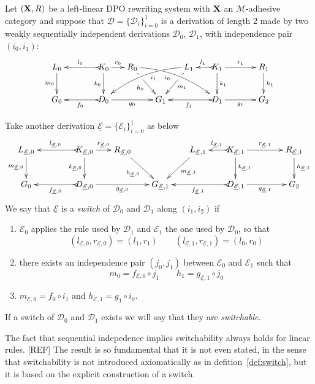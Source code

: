 \documentclass[a4paper,UKenglish,cleveref,pdftex, thm-restate,numberwithinsect]{lipics}
\def\R{\mathsf{R}}
\def\X{\textbf {\textup{X}}}
\newcommand{\dder}[1]{\mathscr{#1}}
\newcommand{\der}[1]{\underline{\dder{#1}}}
\begin{document}
\begin{definition}[Switch]
  \label{def:switch}
  Let $(\X, \R)$ be a left-linear DPO rewriting system with $\X$ an
  $\mathcal{M}$-adhesive category and suppose that
  $\der{D}=\{\dder{D}_i\}_{i=0}^1$ is a derivation of length $2$ made
  by two weakly sequentially independent derivations $\dder{D}_0$,
  $\dder{D}_1$, with independence pair $(i_0, i_1)$:
  \[\xymatrix@C=15pt{L_0 \ar[d]_{m_0}&& K_0 \ar[d]_{k_0}\ar@{>->}[ll]_{l_0} \ar[r]^{r_0} & R_0 \ar@/^.35cm/[drrr]|(.3)\hole_(.4){i_0} \ar[dr]|(.3)\hole_{h_0} && L_1 \ar@/_.35cm/[dlll]^(.4){i_1} \ar[dl]|(.3)\hole^{m_1}& K_1 \ar[d]^{k_1}\ar@{>->}[l]_{l_1} \ar[rr]^{r_1} && R_1 \ar[d]^{h_1}\\G_0 && \ar@{>->}[ll]^{f_0} D_0 \ar[rr]_{g_0}&& G_1  && \ar@{>->}[ll]^{f_1} D_1 \ar[rr]_{g_1}&& G_2}\]
 	
  Take another derivation $\der{E}=\{\dder{E}_i\}_{i=0}^1$ as below
\[\xymatrix@C=18pt{L_{\der{E},0} \ar[d]_{m_{\der{E},0}}&& K_{\der{E},0} \ar[d]_{k_{\der{E},0}}\ar@{>->}[ll]_{l_{\der{E},0}} \ar[r]^{r_{\der{E},0}} & R_{\der{E},0} \ar[dr]_{h_{\der{E},0}} && L_{\der{E},1} \ar[dl]^{m_{\der{E},1}}& K_{\der{E},1} \ar[d]^{k_{\der{E},1}}\ar@{>->}[l]_{l_{\der{E},1}} \ar[rr]^{r_{\der{E},1}} && R_{\der{E},1} \ar[d]^{h_{\der{E},1}}\\G_{0} && \ar@{>->}[ll]^{f_{\der{E},0}} D_{\der{E},0} \ar[rr]_{g_{\der{E},0}}&& G_{\der{E},1} && \ar@{>->}[ll]^{f_{\der{E},1}} D_{\der{E},1} \ar[rr]_{g_{\der{E},1}}&& G_{2}}\]
 	We say that $\der{E}$ is a
 	 	 \emph{switch} of $\dder{D}_0$ and $\dder{D}_1$ along $(i_1, i_2)$ if
 	\begin{enumerate}
 		\item $\dder{E}_0$ applies the rule used by $\dder{D}_1$ and $\dder{E}_1$ the one used by $\dder{D}_0$, so that
 		\[(l_{\der{E},0}, r_{\der{E},0})=(l_1,r_1)  \qquad (l_{\der{E},1}, r_{\der{E},1})=(l_0,r_0)\]
 		\item there exists an independence pair $(j_0, j_1)$ between $\dder{E}_0$ and $\dder{E}_1$ such that
 		\[ m_0=f_{\der{E},0} \circ j_1 \qquad h_1=g_{\der{E},1} \circ j_0\]
 		\item $m_{\der{E},0}= f_0\circ i_1$ and $h_{\der{E},1}= g_{1}\circ i_0$.
 	\end{enumerate}

If a switch of $\dder{D}_0$ and $\dder{D}_1$ exists we will say that they are \emph{switchable}.
\end{definition}

The fact that sequential indepedence implies switchability always holds for linear rules. [REF]
The result is so fundamental that it is not even stated, in the sense that switchability is not introduced axiomatically as in defition~\ref{def:switch}, but it is based on the explicit construction of a switch.
\end{document}
